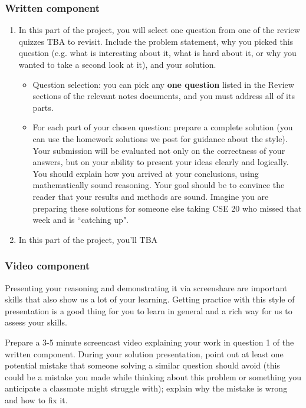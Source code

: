 \documentclass[12pt, oneside]{article}
\begin{document}
\subsubsection*{Written component}
\begin{enumerate}
\item In this part of the project, you will select one question from one of the review quizzes 
TBA to revisit. 
Include the problem statement, why you picked this question (e.g. what is interesting about it, 
what is hard about it, or why you wanted to take a second look at it), and your solution. 
    \begin{itemize}
        \item Question selection: you can pick any {\bf one question} listed in the Review 
        sections of the relevant notes documents, and you must address all of its parts.
        \item For each part of your chosen question: prepare a complete solution 
        (you can use the homework solutions we post for guidance about the style). 
        Your submission will be evaluated not only on the correctness of your answers, 
        but on your ability to present your ideas clearly and logically. 
        You should explain how you arrived at your conclusions, using mathematically 
        sound reasoning. Your goal should be to convince the reader that your results 
        and methods are sound. Imagine you are preparing these solutions for someone else 
        taking CSE 20 who missed that week and is ``catching up".
    \end{itemize}
\item In this part of the project, you'll TBA

\end{enumerate}

\subsubsection*{Video component}

Presenting your reasoning and demonstrating it via screenshare are important skills that 
also show us a lot of your learning. Getting practice with this style of presentation 
is a good thing for you to learn in general and a rich way for us to assess your skills. 

Prepare a 3-5 minute screencast video explaining your work in question 1 of the written component.
During your solution presentation, point out at least one potential mistake that someone 
solving a similar question should avoid (this could be a mistake you made while thinking 
about this problem or something you anticipate a classmate might struggle with); 
explain why the mistake is wrong and how to fix it. 
\end{document}
